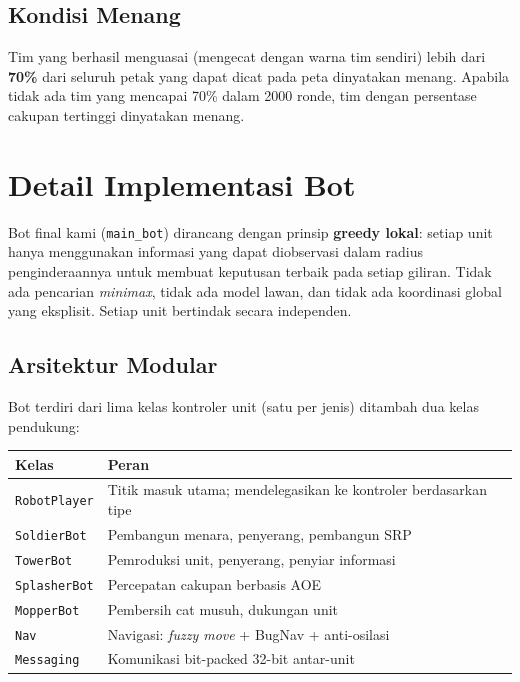 \documentclass[12pt, a4paper]{article}
\begin{document}
\subsection*{Kondisi Menang}

Tim yang berhasil menguasai (mengecat dengan warna tim sendiri) lebih dari
\textbf{70\%} dari seluruh petak yang dapat dicat pada peta dinyatakan menang.
Apabila tidak ada tim yang mencapai 70\% dalam 2000 ronde, tim dengan persentase
cakupan tertinggi dinyatakan menang.

\section{Detail Implementasi Bot}

Bot final kami (\texttt{main\_bot}) dirancang dengan prinsip \textbf{greedy lokal}:
setiap unit hanya menggunakan informasi yang dapat diobservasi dalam radius
penginderaannya untuk membuat keputusan terbaik pada setiap giliran. Tidak ada
pencarian \textit{minimax}, tidak ada model lawan, dan tidak ada koordinasi global
yang eksplisit. Setiap unit bertindak secara independen.

\subsection{Arsitektur Modular}

Bot terdiri dari lima kelas kontroler unit (satu per jenis) ditambah dua kelas
pendukung:

\begin{center}
\begin{tabular}{lp{9cm}}
\toprule
\textbf{Kelas} & \textbf{Peran} \\
\midrule
\texttt{RobotPlayer}  & Titik masuk utama; mendelegasikan ke kontroler berdasarkan tipe \\
\texttt{SoldierBot}   & Pembangun menara, penyerang, pembangun SRP \\
\texttt{TowerBot}     & Pemroduksi unit, penyerang, penyiar informasi \\
\texttt{SplasherBot}  & Percepatan cakupan berbasis AOE \\
\texttt{MopperBot}    & Pembersih cat musuh, dukungan unit \\
\texttt{Nav}          & Navigasi: \textit{fuzzy move} + BugNav + anti-osilasi \\
\texttt{Messaging}    & Komunikasi bit-packed 32-bit antar-unit \\
\bottomrule
\end{tabular}
\end{center}
\end{document}
